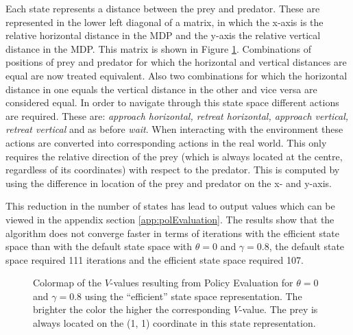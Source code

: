 \documentclass{article}
\begin{document}
Each state represents a distance between the prey and predator. These are represented in the lower left diagonal of a matrix, in which the x-axis is the relative horizontal distance in the MDP and the y-axis the relative vertical distance in the MDP. This matrix is shown in Figure \ref{NewStateRep}. Combinations of positions of prey and predator for which the horizontal and vertical distances are equal are now treated equivalent. 
Also two combinations for which the horizontal distance in one equals the vertical distance in the other and vice versa are considered equal. In order to navigate through this state space different actions are required. These are: \textit{approach horizontal, retreat horizontal, approach vertical, retreat vertical} and as before \textit{wait}. When interacting with the environment these actions are converted into corresponding actions in the real world. This only requires the relative direction of the prey (which is always located at the centre, regardless of its coordinates) with respect to the predator. This is computed by using the difference in location of the prey and predator on the x- and y-axis.

This reduction in the number of states has lead to output values which can be viewed in the appendix section \ref{app:polEvaluation}. The results show that the algorithm does not converge faster in terms of iterations with the efficient state space than with the default state space with $\theta=0$ and $\gamma=0.8$, the default state space required 111 iterations and the efficient state space required 107. 

\begin{figure}[htbp]
        \caption{\label{NewStateRep} Colormap of the $V$-values  resulting from Policy Evaluation for $\theta=0$ and $\gamma = 0.8$ \newline using the ``efficient'' state space representation. The brighter the color the higher the corresponding $V$-value. The prey is always located on the (1, 1) coordinate in this state representation.}
\end{figure}
\end{document}

